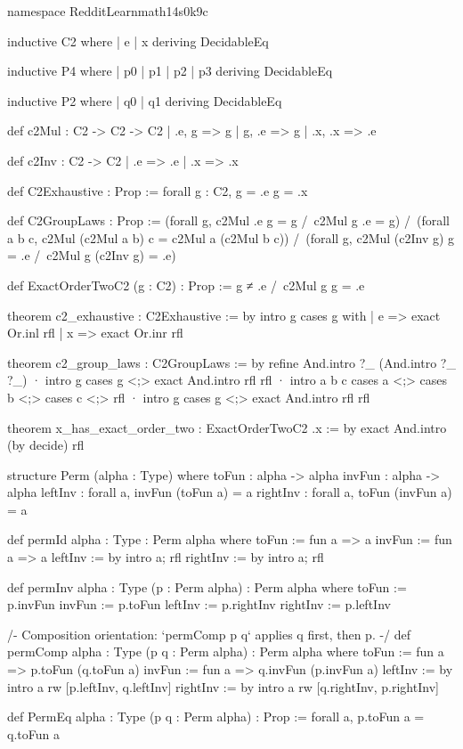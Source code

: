 \documentclass[11pt]{article}
\begin{document}
\begin{Vlean}
namespace RedditLearnmath14s0k9c

inductive C2 where
  | e | x
  deriving DecidableEq

inductive P4 where
  | p0 | p1 | p2 | p3
  deriving DecidableEq

inductive P2 where
  | q0 | q1
  deriving DecidableEq

def c2Mul : C2 -> C2 -> C2
  | .e, g => g
  | g, .e => g
  | .x, .x => .e

def c2Inv : C2 -> C2
  | .e => .e
  | .x => .x

def C2Exhaustive : Prop :=
  forall g : C2, g = .e \/ g = .x

def C2GroupLaws : Prop :=
  (forall g, c2Mul .e g = g /\ c2Mul g .e = g) /\
  (forall a b c, c2Mul (c2Mul a b) c = c2Mul a (c2Mul b c)) /\
  (forall g, c2Mul (c2Inv g) g = .e /\ c2Mul g (c2Inv g) = .e)

def ExactOrderTwoC2 (g : C2) : Prop :=
  g ≠ .e /\ c2Mul g g = .e

theorem c2_exhaustive : C2Exhaustive := by
  intro g
  cases g with
  | e => exact Or.inl rfl
  | x => exact Or.inr rfl

theorem c2_group_laws : C2GroupLaws := by
  refine And.intro ?_ (And.intro ?_ ?_)
  · intro g
    cases g <;> exact And.intro rfl rfl
  · intro a b c
    cases a <;> cases b <;> cases c <;> rfl
  · intro g
    cases g <;> exact And.intro rfl rfl

theorem x_has_exact_order_two : ExactOrderTwoC2 .x := by
  exact And.intro (by decide) rfl

structure Perm (alpha : Type) where
  toFun : alpha -> alpha
  invFun : alpha -> alpha
  leftInv : forall a, invFun (toFun a) = a
  rightInv : forall a, toFun (invFun a) = a

def permId {alpha : Type} : Perm alpha where
  toFun := fun a => a
  invFun := fun a => a
  leftInv := by intro a; rfl
  rightInv := by intro a; rfl

def permInv {alpha : Type} (p : Perm alpha) : Perm alpha where
  toFun := p.invFun
  invFun := p.toFun
  leftInv := p.rightInv
  rightInv := p.leftInv

/- Composition orientation: `permComp p q` applies q first, then p. -/
def permComp {alpha : Type} (p q : Perm alpha) : Perm alpha where
  toFun := fun a => p.toFun (q.toFun a)
  invFun := fun a => q.invFun (p.invFun a)
  leftInv := by
    intro a
    rw [p.leftInv, q.leftInv]
  rightInv := by
    intro a
    rw [q.rightInv, p.rightInv]

def PermEq {alpha : Type} (p q : Perm alpha) : Prop :=
  forall a, p.toFun a = q.toFun a


\end{Vlean}
\end{document}
